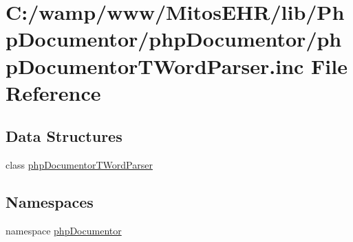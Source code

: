 \hypertarget{php_documentor_t_word_parser_8inc}{\section{\-C\-:/wamp/www/\-Mitos\-E\-H\-R/lib/\-Php\-Documentor/php\-Documentor/php\-Documentor\-T\-Word\-Parser.inc \-File \-Reference}
\label{php_documentor_t_word_parser_8inc}
}
\subsection*{\-Data \-Structures}
\begin{DoxyCompactItemize}
\item 
class \hyperlink{classphp_documentor_t_word_parser}{php\-Documentor\-T\-Word\-Parser}
\end{DoxyCompactItemize}
\subsection*{\-Namespaces}
\begin{DoxyCompactItemize}
\item 
namespace \hyperlink{namespacephp_documentor}{php\-Documentor}
\end{DoxyCompactItemize}
